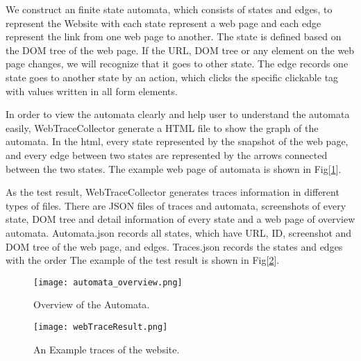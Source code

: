 We construct an finite state automata, which consists of states and edges, to represent the Website
with each state represent a web page and each edge represent the link from one web page to another.
The state is defined based on the DOM tree of the web page.
If the URL, DOM tree or any element on the web page changes, we will recognize that it goes to other state.
The edge records one state goes to another state by an action,
which clicks the specific clickable tag with values written in all form elements.

In order to view the automata clearly and help user to understand the automata easily,
WebTraceCollector generate a HTML file to show the graph of the automata.
In the html, every state represented by the snapshot of the web page,
and every edge between two states are represented by the arrows connected between the two states.
The example web page of automata is shown in Fig[\ref{AutomataOverview}].

As the test result, WebTraceCollector generates traces information in different types of files. 
There are JSON files of traces and automata, screenshots of every state, DOM tree and detail information of every state and a web page of overview automata.
Automata.json records all states, which have URL, ID, screenshot and DOM tree of the web page, and edges.
Traces.json records the states and edges with the order
The example of the test result is shown in Fig[\ref{TestResult}].

\clearpage

\begin{figure}[h]
	\graphicspath{{pic/}}
	\begin{center}
		\texttt{[image: automata\_overview.png]}
	\end{center}
	\caption{ Overview of the Automata. }
	\label{AutomataOverview}
\end{figure}

\begin{figure}[h]
	\graphicspath{{pic/}}
	\begin{center}
		\texttt{[image: webTraceResult.png]}
	\end{center}
	\caption{An Example traces of the website. }
	\label{TestResult}
\end{figure}


